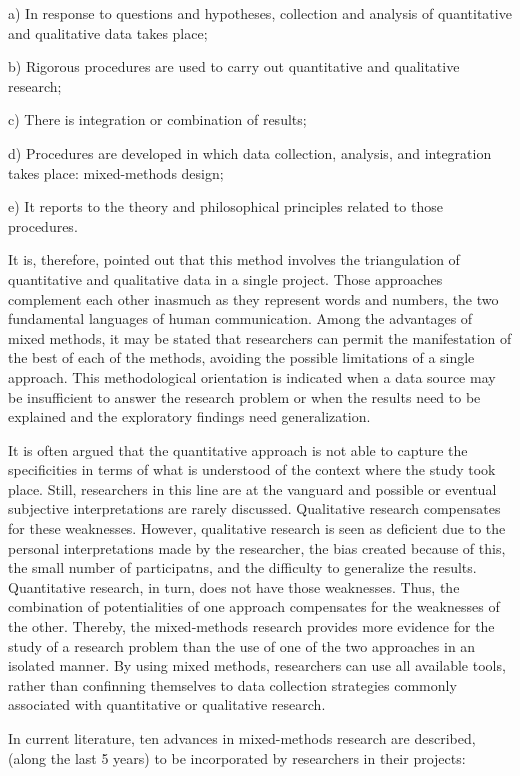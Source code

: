 a) In response to questions and hypotheses, collection and analysis of quantitative and qualitative data takes place;

b) Rigorous procedures are used to carry out quantitative and qualitative research;

c) There is integration or combination of results;

d) Procedures are developed in which data collection, analysis, and integration takes place: mixed-methods design;

e) It reports to the theory and philosophical principles related to those procedures.

It is, therefore, pointed out that this method involves the triangulation of quantitative and qualitative data in a single project. Those approaches complement each other inasmuch as they represent words and numbers, the two fundamental languages of human communication. Among the advantages of mixed methods, it may be stated that researchers can permit the manifestation of the best of each of the methods, avoiding the possible limitations of a single approach. This methodological orientation is indicated when a data source may be insufficient to answer the research problem or when the results need to be explained and the exploratory findings need generalization.

It is often argued that the quantitative approach is not able to capture the specificities in terms of what is understood of the context where the study  took place. Still, researchers in this line are at the vanguard and possible or eventual subjective interpretations are rarely discussed. Qualitative research compensates for these weaknesses. However, qualitative research is seen as deficient due to the personal interpretations made by the researcher, the bias created because of this, the small number of participatns, and the difficulty to generalize the results. Quantitative research, in turn, does not have those weaknesses. Thus, the combination of potentialities of one approach compensates for the weaknesses of the other. Thereby, the mixed-methods research provides more evidence for the study of a research problem than the use of one of the two approaches in an isolated manner. By using mixed methods, researchers can use all available tools, rather  than confinning themselves to data collection strategies commonly associated with quantitative or qualitative research. 

In current literature, ten advances in mixed-methods research are described, (along the last 5 years) to be incorporated by researchers in their projects:

